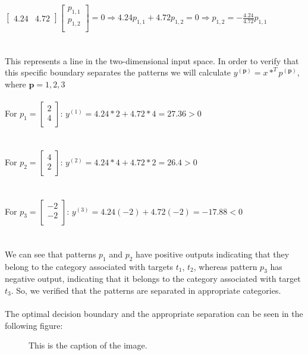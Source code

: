 \documentclass{article}
\begin{document}
\begin{enumerate}[label=\Alph*]
    $\begin{bmatrix}
      4.24 & 4.72
    \end{bmatrix} 
    \begin{bmatrix}
      p_{1,1} \\
      p_{1,2} \\
    \end{bmatrix} = 0 \Rightarrow 4.24p_{1,1} + 4.72p_{1,2} = 0 \Rightarrow p_{1,2} = -\frac{4.24}{4.72}p_{1,1}$ \\ \\ \\This represents a line in the two-dimensional input space. In order to verify
    that this specific boundary separates the patterns we will calculate $y^{(\bm{p})} = x*^Tp^{(\bm{p})}$, where $\bm{p} = 1,2,3$ \\\\ For $p_1 = 
    \begin{bmatrix}
      2 \\
      4 \\
    \end{bmatrix}$: $y^{(1)} = 4.24*2 + 4.72*4 = 27.36 > 0$ \\ \\ \\For $p_2 = 
    \begin{bmatrix}
      4 \\
      2 \\
    \end{bmatrix}$: $y^{(2)} = 4.24*4 + 4.72*2 = 26.4 > 0$ \\ \\ \\For $p_3 = 
    \begin{bmatrix}
      -2 \\
      -2 \\
    \end{bmatrix}$: $y^{(3)} = 4.24(-2) + 4.72(-2) = -17.88 < 0$ \\ \\ \\ We can see that patterns $p_1$ and $p_2$ have positive outputs indicating that they belong to the category associated with 
    targets $t_1$, $t_2$, whereas pattern $p_3$ has negative output, indicating that it belongs to the category associated with target $t_3$. So, we verified that the patterns are separated in appropriate 
    categories. \\ \\ The optimal decision boundary and the appropriate separation can be seen in the following figure:
    \begin{figure}[h]
      \centering
      \caption{This is the caption of the image.}
    \end{figure} 


\end{enumerate}
\end{document}
